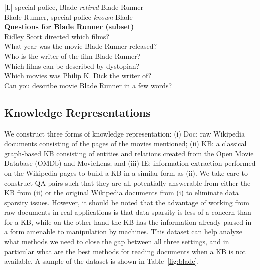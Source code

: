 \documentclass[11pt,letterpaper]{article}
\newcommand{\WikiMovies}{{\sc WikiMovies}\xspace}
\begin{document}
\begin{table}[t]
\begin{small}
\begin{center}
{{\begin{tabular}{|L|}
\textcolor{die}{special police, Blade {\em retired} Blade Runner}\\
\textcolor{die}{Blade Runner, special police {\em known} Blade}
\\
\hline
{\bf Questions for Blade Runner (subset)}\\
\vspace{1mm}
\textcolor{dgreen}{Ridley Scott directed which films?}\\
\textcolor{dgreen}{What year was the movie Blade Runner released?}\\
\textcolor{dgreen}{Who is the writer of the film Blade Runner?}\\
\textcolor{dgreen}{Which films can be described by dystopian?}\\
\textcolor{dgreen}{Which movies was Philip K. Dick the writer of?}\\
\textcolor{dgreen}{Can you describe movie Blade Runner in a few words?}
\\






\hline
\end{tabular}
}}
\caption{
\label{fig:blade}
{\bf \WikiMovies}: Questions, Doc, KB and IE sources.}
\end{center}
\end{small}
\vspace{-1ex}
\end{table}







\subsection{Knowledge Representations} \label{sec:kr}

We construct three forms of knowledge representation:
(i) Doc: raw Wikipedia documents consisting of the pages of the movies mentioned;
(ii) KB: a classical graph-based KB consisting of entities
and relations created from the Open Movie Database (OMDb) and MovieLens;
and (iii) IE: information extraction performed on the Wikipedia pages to
build a KB in a similar form as (ii).
We take care to construct QA pairs such that they are all potentially answerable
from either the KB from (ii) or the original  Wikipedia documents from (i) to
eliminate data sparsity issues. However, it should
 be noted that the advantage of working from raw documents in real applications
is that data sparsity is less of a concern than for a KB, while on the other hand the KB
has the information already parsed in a form amenable to manipulation by machines.
This dataset can help analyze what  methods we need
to close the gap between all three settings, and in particular what
are the best methods for reading documents when a KB is not available.
A sample of the dataset is shown in Table~\ref{fig:blade}.
\end{document}
